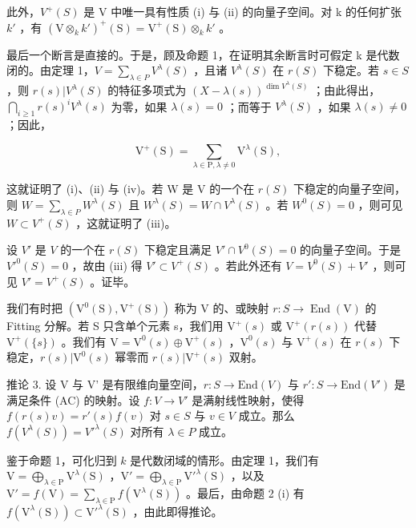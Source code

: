 此外，\(V^{+}(S)\) 是 V 中唯一具有性质 (i) 与 (ii) 的向量子空间。对 k 的任何扩张 \(k'\) ，有 \((\mathrm{V} \otimes_{k} k')^{+}(\mathrm{S}) = \mathrm{V}^{+}(\mathrm{S}) \otimes_{k} k'\) 。

最后一个断言是直接的。于是，顾及命题 1，在证明其余断言时可假定 k 是代数闭的。由定理 1，\(V = \sum_{\lambda \in P} V^{\lambda}(S)\) ，且诸 \(V^{\lambda}(S)\) 在 \(r(S)\) 下稳定。若 \(s \in S\) ，则 \(r(s)|V^{\lambda}(S)\) 的特征多项式为 \((X - \lambda(s))^{\dim V^{\lambda}(S)}\) ；由此得出，\(\bigcap_{i \geq 1} r(s)^{i} V^{\lambda}(s)\) 为零，如果 \(\lambda(s) = 0\) ；而等于 \(V^{\lambda}(S)\) ，如果 \(\lambda(s) \neq 0\) ；因此，

\[
\mathrm{V} ^ {+} (\mathrm{S}) = \sum_ {\lambda \in \mathrm{P}, \lambda \neq 0} \mathrm{V} ^ {\lambda} (\mathrm{S}),\tag{3}
\]

这就证明了 (i)、(ii) 与 (iv)。若 W 是 V 的一个在 \(r(S)\) 下稳定的向量子空间，则 \(W = \sum_{\lambda \in P} W^{\lambda}(S)\) 且 \(W^{\lambda}(S) = W \cap V^{\lambda}(S)\) 。若 \(W^{0}(S) = 0\) ，则可见 \(W \subset V^{+}(S)\) ，这就证明了 (iii)。

设 \(V'\) 是 \(V\) 的一个在 \(r(S)\) 下稳定且满足 \(V' \cap V^0(S) = 0\) 的向量子空间。于是 \(V'^0(S) = 0\) ，故由 (iii) 得 \(V' \subset V^+(S)\) 。若此外还有 \(V = V^0(S) + V'\) ，则可见 \(V' = V^+(S)\) 。证毕。

我们有时把 \((\mathrm{V}^{0}(\mathrm{S}),\mathrm{V}^{+}(\mathrm{S}))\) 称为 V 的、或映射 \(r:S\to\operatorname{End}(\mathrm{V})\) 的 Fitting 分解。若 S 只含单个元素 s，我们用 \(\mathrm{V}^{+}(s)\) 或 \(\mathrm{V}^{+}(r(s))\) 代替 \(\mathrm{V}^{+}(\{s\})\) 。我们有 \(\mathrm{V}=\mathrm{V}^{0}(s)\oplus\mathrm{V}^{+}(s)\) ，\(\mathrm{V}^{0}(s)\) 与 \(\mathrm{V}^{+}(s)\) 在 \(r(s)\) 下稳定，\(r(s)|\mathrm{V}^{0}(s)\) 幂零而 \(r(s)|\mathrm{V}^{+}(s)\) 双射。

推论 3. 设 V 与 V' 是有限维向量空间，\(r: S \to \text{End}(V)\) 与 \(r': S \to \text{End}(V')\) 是满足条件 (AC) 的映射。设 \(f: V \to V'\) 是满射线性映射，使得 \(f(r(s)v) = r'(s)f(v)\) 对 \(s \in S\) 与 \(v \in V\) 成立。那么 \(f(V^{\lambda}(S)) = V'^{\lambda}(S)\) 对所有 \(\lambda \in P\) 成立。

鉴于命题 1，可化归到 \(k\) 是代数闭域的情形。由定理 1，我们有 \(\mathrm{V} = \bigoplus_{\lambda \in \mathrm{P}} \mathrm{V}^{\lambda}(\mathrm{S})\) ，\(\mathrm{V}' = \bigoplus_{\lambda \in \mathrm{P}} \mathrm{V}'^{\lambda}(\mathrm{S})\) ，以及 \(\mathrm{V}' = f(\mathrm{V}) = \sum_{\lambda \in \mathrm{P}} f(\mathrm{V}^{\lambda}(\mathrm{S}))\) 。最后，由命题 2 (i) 有 \(f(\mathrm{V}^{\lambda}(\mathrm{S})) \subset \mathrm{V}'^{\lambda}(\mathrm{S})\) ，由此即得推论。

